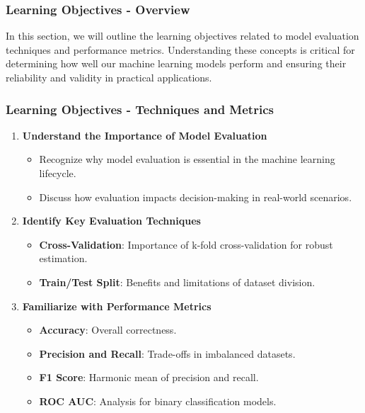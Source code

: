 \documentclass[aspectratio=169]{beamer}
\begin{document}
\begin{frame}[fragile]
    \frametitle{Learning Objectives - Overview}
    In this section, we will outline the learning objectives related to model evaluation techniques and performance metrics. Understanding these concepts is critical for determining how well our machine learning models perform and ensuring their reliability and validity in practical applications.
\end{frame}

\begin{frame}[fragile]
    \frametitle{Learning Objectives - Techniques and Metrics}
    \begin{enumerate}
        \item \textbf{Understand the Importance of Model Evaluation}
        \begin{itemize}
            \item Recognize why model evaluation is essential in the machine learning lifecycle.
            \item Discuss how evaluation impacts decision-making in real-world scenarios.
        \end{itemize}
        
        \item \textbf{Identify Key Evaluation Techniques}
        \begin{itemize}
            \item \textbf{Cross-Validation}: Importance of k-fold cross-validation for robust estimation.
            \item \textbf{Train/Test Split}: Benefits and limitations of dataset division.
        \end{itemize}

        \item \textbf{Familiarize with Performance Metrics}
        \begin{itemize}
            \item \textbf{Accuracy}: Overall correctness.
            \item \textbf{Precision and Recall}: Trade-offs in imbalanced datasets.
            \item \textbf{F1 Score}: Harmonic mean of precision and recall.
            \item \textbf{ROC AUC}: Analysis for binary classification models.
        \end{itemize}
    \end{enumerate}
\end{frame}
\end{document}
